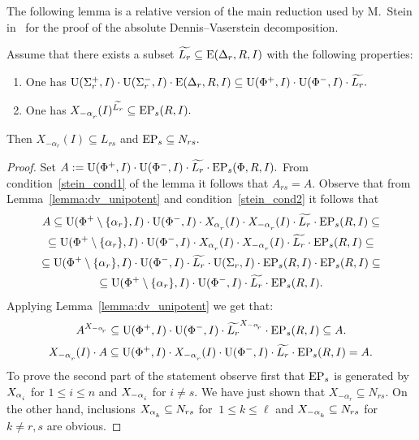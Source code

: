 The following lemma is a relative version of the main reduction used by M.~Stein in~\cite{St78} for the proof of the absolute Dennis--Vaserstein decomposition.
\begin{lemma}\label{Stein_reduction}
Assume that there exists a subset $\widetilde{L_r} \subseteq \operatorname{E}(\Delta_r, R, I)$ with the following properties:
\begin{enumerate}[label=(\alph*)] 
 \item\label{stein_cond1} One has $\operatorname{U}(\Sigma^+_r, I)\cdot \operatorname{U}(\Sigma^-_r, I) \cdot \operatorname{E}(\Delta_r, R, I) \subseteq \operatorname{U}(\Phi^+, I)\cdot \operatorname{U}(\Phi^-, I) \cdot \widetilde{L_r}.$
 \item\label{stein_cond2} One has $X_{-\alpha\ssub{r}}(I)^{\widetilde{L_r}} \subseteq \EP_s(R, I).$
\end{enumerate}
Then $X_{-\alpha_r}(I) \subseteq L_{rs}$ and $\operatorname{EP}_s \subseteq N_{rs}.$
\end{lemma}
\begin{proof} Set $A:=\operatorname{U}(\Phi^+, I)\cdot \operatorname{U}(\Phi^-, I) \cdot \widetilde{L_r} \cdot \operatorname{EP}_s(\Phi, R, I).$
From condition~\ref{stein_cond1} of the lemma it follows that $A_{rs}=A$.
Observe that from Lemma~\ref{lemma:dv_unipotent} and condition~\ref{stein_cond2} it follows that
\begin{multline}\nonumber 
A \subseteq \U(\Phi^+\setminus \{\alpha_r\}, I) \cdot \U(\Phi^-, I) \cdot X_{\alpha\ssub{r}}(I) \cdot X_{-\alpha\ssub{r}}(I) \cdot \widetilde{L_r} \cdot \EP_s(R, I) \subseteq \\ 
\subseteq \U(\Phi^+\setminus\{\alpha_r\}, I) \cdot \U(\Phi^-, I) \cdot X_{\alpha\ssub{r}}(I) \cdot X_{-\alpha\ssub{r}}(I) \cdot \widetilde{L_r} \cdot \EP_s(R, I) \subseteq \\
\subseteq \U(\Phi^+\setminus\{\alpha_r\}, I) \cdot \U(\Phi^-, I) \cdot \widetilde{L_r} \cdot \U(\Sigma_r, I) \cdot \EP_s(R, I)  \cdot \EP_s(R, I) \subseteq \\
\subseteq \U(\Phi^+\setminus\{\alpha_r\}, I) \cdot \U(\Phi^-, I) \cdot \widetilde{L_r} \cdot \EP_s(R, I). \end{multline}
Applying Lemma~\ref{lemma:dv_unipotent} we get that:
\begin{equation}\nonumber A^{X_{-\alpha\ssub{r}}} \subseteq \U(\Phi^+, I) \cdot \U(\Phi^-, I) \cdot \widetilde{L_r} ^{X_{-\alpha\ssub{r}}} \cdot \EP_s(R, I) \subseteq A. \end{equation}
\begin{equation}\nonumber X_{-\alpha\ssub{r}}(I) \cdot A \subseteq \U(\Phi^+, I) \cdot X_{-\alpha\ssub{r}}(I) \cdot \U(\Phi^-, I) \cdot \widetilde{L_r} \cdot \EP_s(R, I) = A. \end{equation}
To prove the second part of the statement observe first that $\operatorname{EP}_s$ is generated by $X_{\alpha\ssub{i}}$ for $1\leq i\leq n$ and $X_{-\alpha\ssub{i}}$ for $i\neq s$.
We have just shown that $X_{-\alpha_r}\subseteq N_{rs}$.
On the other hand, inclusions $X_{\alpha\ssub{k}} \subseteq N_{rs}$ for $\ 1\leq k\leq \ell$ and $X_{-\alpha\ssub{k}} \subseteq N_{rs}$ for $k\neq r,s$ are obvious.
\end{proof}

